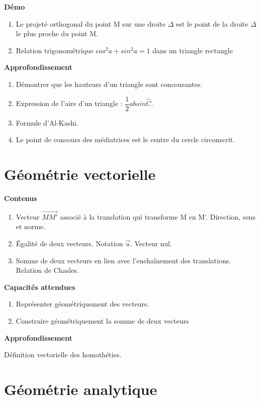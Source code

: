 \documentclass[10pt,a4paper]{article}
\begin{document}
\textbf{Démo}
 
\begin{enumerate}
\item Le projeté orthogonal du point M sur une droite $\Delta$ est le point de la droite $\Delta$ le plus proche du point M.
\item Relation trigonométrique $cos^2a + sin^2 a = 1$ dans un triangle rectangle
\end{enumerate}


\textbf{Approfondissement}

\begin{enumerate}
\item Démontrer que les hauteurs d'un triangle sont concourantes.
\item Expression de l'aire d’un triangle : $\dfrac12 ab sin\widehat C$.
\item Formule d'Al-Kashi.
\item Le point de concours des médiatrices est le centre du cercle circonscrit.
\end{enumerate}

\section{Géométrie vectorielle}

\textbf{Contenus}

\begin{enumerate}
\item  Vecteur $\overrightarrow{MM'}$ associé à la translation qui transforme M en M'. Direction, sens et norme.
\item  Égalité de deux vecteurs. Notation $\vec{u}$. Vecteur nul.
\item  Somme de deux vecteurs en lien avec l'enchaînement des translations. Relation de Chasles.
\end{enumerate}

\textbf{Capacités attendues}
 
\begin{enumerate}
\item Représenter géométriquement des vecteurs.
\item Construire géométriquement la somme de deux vecteurs
\end{enumerate}




\textbf{Approfondissement}


Définition vectorielle des homothéties.


\section{Géométrie analytique}
\end{document}
